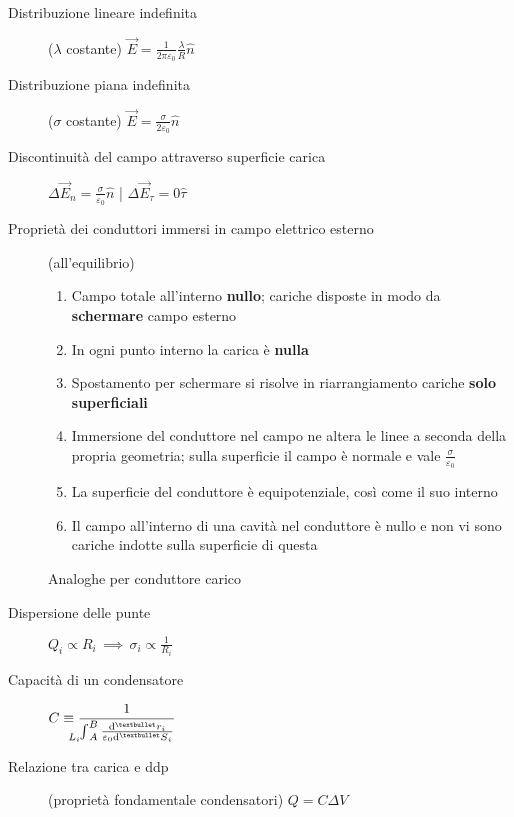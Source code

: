 \documentclass[10pt, oneside]{article}
\begin{document}
\begin{description}
\item[Distribuzione lineare indefinita] ($\lambda$ costante) \hfill $\displaystyle \vec{E} = \frac{1}{2 \pi \varepsilon_0} \frac{\lambda}{R} \hat{n}$

\item[Distribuzione piana indefinita] ($\sigma$ costante) \hfill $\displaystyle \vec{E} = \frac{\sigma}{2 \varepsilon_0} \hat{n}$

\item[Discontinuità del campo attraverso superficie carica] \hfill $\displaystyle \Delta \vec{E}_n = \frac{\sigma}{\varepsilon_0} \hat{n}$ \quad | \quad $\displaystyle \Delta \vec{E}_\tau = 0 \hat{\tau}$

\item[Proprietà dei conduttori immersi in campo elettrico esterno] (all'equilibrio)
\begin{enumerate}
\item Campo totale all'interno \textbf{nullo}; cariche disposte in modo da \textbf{schermare} campo esterno
\item In ogni punto interno la carica è \textbf{nulla}
\item Spostamento per schermare si risolve in riarrangiamento cariche \textbf{solo superficiali}
\item Immersione del conduttore nel campo ne altera le linee a seconda della propria geometria; sulla superficie il campo è normale e vale $\displaystyle \frac{\sigma}{\varepsilon_0}$
\item La superficie del conduttore è equipotenziale, così come il suo interno
\item Il campo all'interno di una cavità nel conduttore è nullo e non vi sono cariche indotte sulla superficie di questa
\end{enumerate} 
Analoghe per conduttore carico

\item[Dispersione delle punte] \hfill $\displaystyle Q_i \propto R_i \, \implies \, \sigma_i \propto \frac{1}{R_i}$

\item[Capacità di un condensatore] \hfill $\displaystyle C \equiv \frac{1}{\int_{\hspace{-0.45cm} L_i \hspace{0.22cm} A}^B \frac{\dd[•]{r_i}}{\varepsilon_0 \dd[•]{S}_i}}$
\item[Relazione tra carica e ddp] (proprietà fondamentale condensatori) \hfill $\displaystyle Q = C \Delta V$


\end{description}
\end{document}
